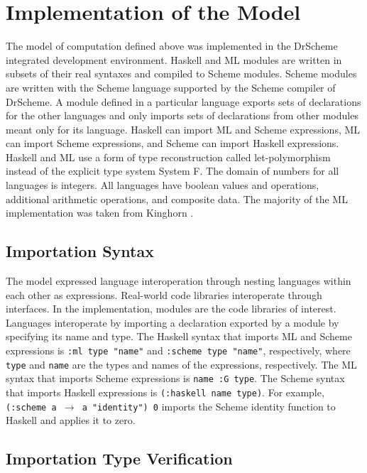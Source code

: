 \chapter{Implementation of the Model}

The model of computation defined above was implemented in the DrScheme integrated development environment.  Haskell and ML modules are written in subsets of their real syntaxes and compiled to Scheme modules.  Scheme modules are written with the Scheme language supported by the Scheme compiler of DrScheme.  A module defined in a particular language exports sets of declarations for the other languages and only imports sets of declarations from other modules meant only for its language.  Haskell can import ML and Scheme expressions, ML can import Scheme expressions, and Scheme can import Haskell expressions.  Haskell and ML use a form of type reconstruction called let-polymorphism instead of the explicit type system System F.  The domain of numbers for all languages is integers.  All languages have boolean values and operations, additional arithmetic operations, and composite data.  The majority of the ML implementation was taken from Kinghorn \cite{kinghorn07}.

\section{Importation Syntax}

The model expressed language interoperation through nesting languages within each other as expressions.  Real-world code libraries interoperate through interfaces.  In the implementation, modules are the code libraries of interest.  Languages interoperate by importing a declaration exported by a module by specifying its name and type.  The Haskell syntax that imports ML and Scheme expressions is \texttt{:ml type "name"} and \texttt{:scheme type "name"}, respectively, where \texttt{type} and \texttt{name} are the types and names of the expressions, respectively.  The ML syntax that imports Scheme expressions is \texttt{name :G type}.  The Scheme syntax that imports Haskell expressions is \texttt{(:haskell name type)}.  For example, \texttt{(:scheme a $\rightarrow$ a "identity") 0} imports the Scheme identity function to Haskell and applies it to zero.

\section{Importation Type Verification}

